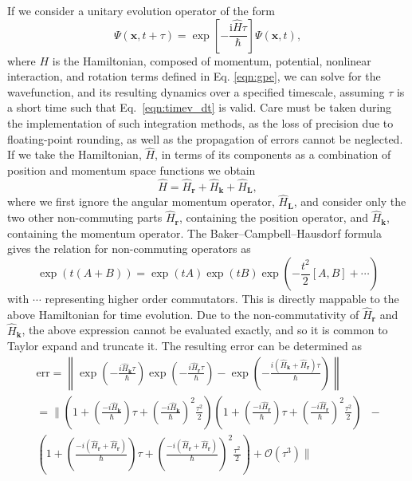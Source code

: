 If we consider a unitary evolution operator of the form
\begin{equation}\label{eqn:1}
\Psi(\mathbf{x},t+\tau) = \exp\left[ -\frac{\text{i}\hat{H}\tau}{\hbar}\right]\Psi(\mathbf{x},t),
\end{equation}
where $H$ is the Hamiltonian, composed of momentum, potential, nonlinear interaction, and rotation terms defined in Eq. \eqref{eqn:gpe}, we can solve for the wavefunction, and its resulting dynamics over a specified timescale, assuming $\tau$ is a short time such that Eq.~\eqref{eqn:timev_dt} is valid. Care must be taken during the implementation of such integration methods, as the loss of precision due to floating-point rounding, as well as the propagation of errors cannot be neglected. If we take the Hamiltonian, $\hat{H}$, in terms of its components as a combination of position and momentum space functions we obtain
\begin{equation}\label{eqn:2}
\hat{H} = \hat{H}_{\textbf{r}} + \hat{H}_{\textbf{k}} + \hat{H}_{\textbf{L}},
\end{equation}
where we first ignore the angular momentum operator, $\hat{H}_{\textbf{L}}$, and consider only the two other non-commuting parts $\hat{H}_{\textbf{r}}$, containing the position operator, and $\hat{H}_{\textbf{k}}$, containing the momentum operator. The Baker--Campbell--Hausdorf formula \cite{NUM:Weyrauch_cpc_2009} gives the relation for non-commuting operators as
\begin{equation}
    \exp\left( t(A+B) \right) = \exp\left(tA\right)\exp\left(tB\right)\exp\left(-\frac{t^2}{2}[A,B] + \cdots\right)
\end{equation}
with $\cdots$ representing higher order commutators. This is directly mappable to the above Hamiltonian for time evolution. Due to the non-commutativity of $\hat{H}_{\textbf{r}}$ and $\hat{H}_{\textbf{k}}$, the above expression cannot be evaluated exactly, and so it is common to Taylor expand and truncate it. The resulting error can be determined as
\begin{subequations}\label{eqn:error_calc}
\begin{align}
    \text{err} = \left\| \exp\left(-\frac{i\hat{H}_{\textbf{k}}\tau}{\hbar}\right)\exp\left(-\frac{i\hat{H}_{\textbf{r}}\tau}{\hbar}\right) - \exp\left(-\frac{i(\hat{H}_{\textbf{k}} + \hat{H}_{\textbf{r}})\tau}{\hbar}\right) \right\| \\
    = {\Biggl\|}  \left(1 + \left(\frac{-i\hat{H}_{\textbf{k}}}{\hbar}\right)\tau + \left(\frac{-i\hat{H}_{\textbf{k}}}{\hbar}\right)^2\frac{\tau^2}{2}  \right)\left(1 + \left(\frac{-i\hat{H}_{\textbf{r}}}{\hbar}\right)\tau + \left(\frac{-i\hat{H}_{\textbf{r}}}{\hbar}\right)^2\frac{\tau^2}{2}  \right) &-\\ \left(1 + \left(\frac{-i(\hat{H}_{\textbf{r}} + \hat{H}_{\textbf{r}})}{\hbar}\right)\tau + \left(\frac{-i(\hat{H}_{\textbf{r}} + \hat{H}_{\textbf{r}})}{\hbar}\right)^2\frac{\tau^2}{2}  \right)  + \mathcal{O}(\tau^3) {\Biggr\|}
\end{align}
\end{subequations}
